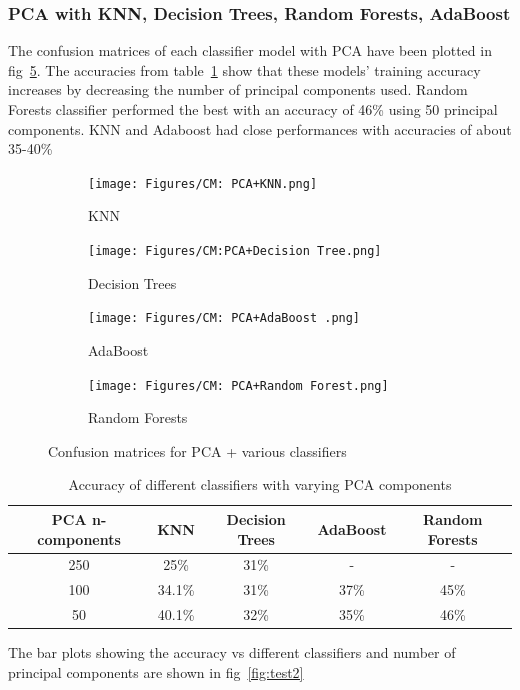 \documentclass[a4paper]{article}
\theoremstyle{plain}
\theoremstyle{definition}
\begin{document}
{\subsubsection {PCA with KNN, Decision Trees, Random Forests, AdaBoost}
The confusion matrices of each classifier model with PCA have been plotted in 
fig~\ref{fig:test1}. The accuracies from table~\ref{tab:performance} show that these models' training accuracy increases by decreasing the number of principal components used. Random Forests classifier performed the best with an accuracy of 46\% using 50 principal components. KNN and Adaboost had close performances with accuracies of about 35-40\%
 \begin{figure}[h]
\centering
\begin{subfigure}{0.5\textwidth} %
  \centering
  \texttt{[image: Figures/CM: PCA+KNN.png]}
  \caption{KNN}
  \label{fig:sub1}
\end{subfigure}%
\hfill %
\begin{subfigure}{0.5\textwidth} %
  \centering
  \texttt{[image: Figures/CM:PCA+Decision Tree.png]}
  \caption{Decision Trees}
  \label{fig:sub2}
\end{subfigure}
\hfill %
\begin{subfigure}{0.5\textwidth} %
  \centering
  \texttt{[image: Figures/CM: PCA+AdaBoost .png]}
  \caption{AdaBoost}
  \label{fig:sub3}
\end{subfigure}%
\hfill %
\begin{subfigure}{0.5\textwidth} %
  \centering
  \texttt{[image: Figures/CM: PCA+Random Forest.png]}
  \caption{Random Forests}
  \label{fig:sub4}
\end{subfigure}
\caption{Confusion matrices for PCA + various classifiers}
\label{fig:test1}
\end{figure} 

\begin{table}[h]
    \centering
    \begin{tabular}{|c|c|c|c|c|}
    \hline
    \textbf{PCA n-components} & \textbf{KNN} & \textbf{Decision Trees} & \textbf{AdaBoost} & \textbf{Random Forests} \\
    \hline
    250 & 25\% & 31\% & - & - \\
    100 & 34.1\% & 31\% & 37\% & 45\% \\
    50 & 40.1\% & 32\% & 35\% & 46\% \\
    \hline
    \end{tabular}
    \caption{Accuracy of different classifiers with varying PCA components}
    \label{tab:performance}
\end{table}
\newpage
\noindent The bar plots showing the accuracy vs different classifiers and number of principal components are shown in fig~\ref{fig:test2}

}
\end{document}
